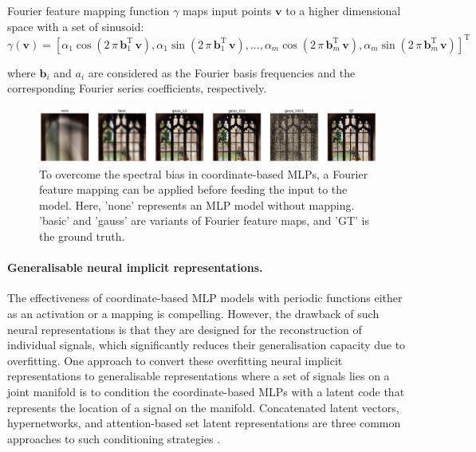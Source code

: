 Fourier feature mapping function $\gamma$ maps input points $\mathbf{v}$ to a higher dimensional space with a set of sinusoid:
\begin{equation}
\gamma(\mathbf{v}) = [\alpha_1 \cos(2 \, \pi \, \mathbf{b}^\mathrm{T}_1 \, \mathbf{v}), \alpha_1 \sin(2 \, \pi \, \mathbf{b}^\mathrm{T}_1 \, \mathbf{v}), ..., \alpha_m \cos(2 \, \pi \, \mathbf{b}^\mathrm{T}_m \, \mathbf{v}), \alpha_m \sin(2 \, \pi \, \mathbf{b}^\mathrm{T}_m \, \mathbf{v})]^\mathrm{T}
\label{eq:ffn}
\end{equation}

where $\mathbf{b}_i$ and $a_i$ are considered as  the Fourier basis frequencies and the corresponding Fourier series coefficients, respectively.

\begin{figure}[ht]
  \centering
   \includegraphics[width=\linewidth]{Images/FFN.png}
   \caption{To overcome the spectral bias in coordinate-based MLPs, a Fourier feature mapping \cite{ffn} can be applied before feeding the input to the model. Here, 'none' represents an MLP model without mapping. 'basic' and 'gauss' are variants of Fourier feature maps, and 'GT' is the ground truth.}
   \label{fig:ffn}
\end{figure}

\paragraph{Generalisable neural implicit representations.}
The effectiveness of coordinate-based \gls{MLP} models with periodic functions either as an activation or a mapping is compelling. However, the drawback of such neural representations is that they are designed for the reconstruction of individual signals, which significantly reduces their generalisation capacity due to overfitting. One approach to convert these overfitting neural implicit representations to generalisable representations where a set of signals lies on a joint manifold is to condition the coordinate-based \gls{MLP}s with a latent code that represents the location of a signal on the manifold. Concatenated latent vectors, hypernetworks, and attention-based set latent representations are three common approaches to such conditioning strategies \cite{rebain2022attention}.

